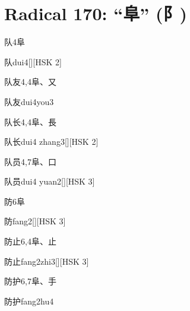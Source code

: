 
\section*{Radical 170: ``⾩'' (⻖)}

\begin{entry}{队}{4}{⾩}
  \begin{phonetics}{队}{dui4}[][HSK 2]
  \end{phonetics}
\end{entry}

\begin{entry}{队友}{4,4}{⾩、⼜}
  \begin{phonetics}{队友}{dui4you3}
  \end{phonetics}
\end{entry}

\begin{entry}{队长}{4,4}{⾩、⾧}
  \begin{phonetics}{队长}{dui4 zhang3}[][HSK 2]
  \end{phonetics}
\end{entry}

\begin{entry}{队员}{4,7}{⾩、⼝}
  \begin{phonetics}{队员}{dui4 yuan2}[][HSK 3]
  \end{phonetics}
\end{entry}

\begin{entry}{防}{6}{⾩}
  \begin{phonetics}{防}{fang2}[][HSK 3]
  \end{phonetics}
\end{entry}

\begin{entry}{防止}{6,4}{⾩、⽌}
  \begin{phonetics}{防止}{fang2zhi3}[][HSK 3]
  \end{phonetics}
\end{entry}

\begin{entry}{防护}{6,7}{⾩、⼿}
  \begin{phonetics}{防护}{fang2hu4}
  \end{phonetics}
\end{entry}

